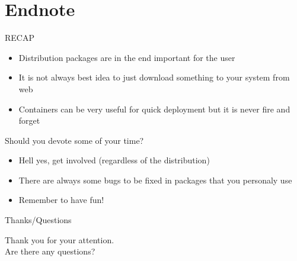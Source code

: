 \documentclass{beamer}
\begin{document}
\section{Endnote}

\begin{frame}[t]{RECAP}
	\begin{itemize}
	\item Distribution packages are in the end important for the user
	\item It is not always best idea to just download something to your system from web
	\item Containers can be very useful for quick deployment but it is never fire and forget
	\end{itemize}
\end{frame}

\begin{frame}[t]{Should you devote some of your time?}
	\begin{itemize}
	\item Hell yes, get involved (regardless of the distribution)
    \item There are always some bugs to be fixed in packages that you personaly use
    \item Remember to have fun!
	\end{itemize}
\end{frame}

\begin{frame}{Thanks/Questions}
	\begin{center}
	Thank you for your attention.\\
	Are there any questions?
	\end{center}
\end{frame}
\end{document}

